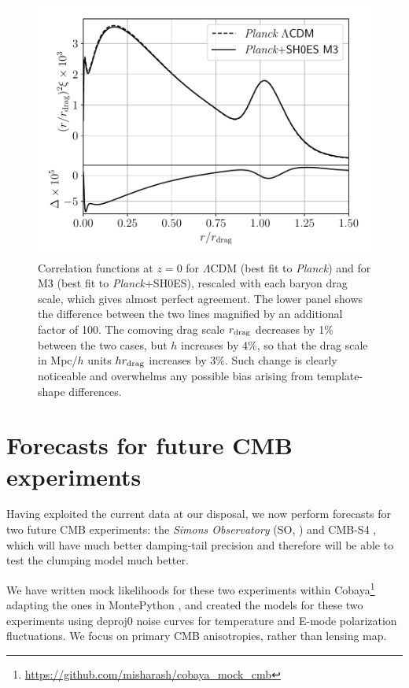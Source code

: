 \begin{figure}[htp!]
\includegraphics[width=\columnwidth]{img/bestfits-corfunc.pdf}
\caption[Correlation functions at $z=0$ for $\Lambda$CDM (best fit to {\it Planck}) and the clumping model (best fit to {\it Planck}+SH0ES) are in almost perfect agreement after proper rescaling]{Correlation functions at $z=0$ for $\Lambda$CDM (best fit to {\it Planck}) and for M3 (best fit to {\it Planck}+SH0ES), rescaled with each baryon drag scale, which gives almost perfect agreement.
The lower panel shows the difference between the two lines magnified by an additional factor of 100.
The comoving drag scale $r_{\rm drag}$ decreases by 1\% between the two cases, but $h$ increases by 4\%, so that the drag scale in Mpc/$h$ units $hr_{\rm drag}$ increases by 3\%.
Such change is clearly noticeable and overwhelms any possible bias arising from template-shape differences.}
\label{fig:bestfits-corfunc}
\end{figure}

\section{Forecasts for future CMB experiments}
\label{sec:forecasts}

Having exploited the current data at our disposal, we now perform forecasts for two future CMB experiments: the {\it Simons Observatory} (SO, \cite{SO}) and CMB-S4 \citep{CMBS4}, which will have much better damping-tail precision and therefore will be able to test the clumping model much better.

We have written mock likelihoods for these two experiments within Cobaya\footnote{\url{https://github.com/misharash/cobaya\_mock\_cmb}} adapting the ones in MontePython \citep{montepython1,montepython3}, and created the models for these two experiments using deproj0 noise curves for temperature and E-mode polarization fluctuations. 
We focus on primary CMB anisotropies, rather than lensing map.


